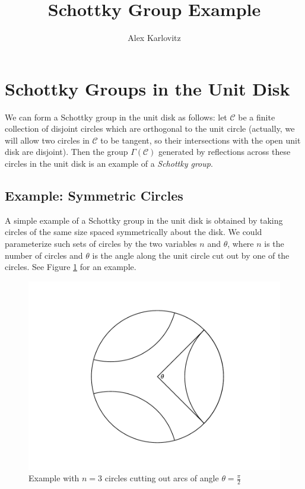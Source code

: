 \documentclass[]{article}
\title{Schottky Group Example}
\author{Alex Karlovitz}
\date{}
\begin{document}
	
	\maketitle
	
\section*{Schottky Groups in the Unit Disk}

We can form a Schottky group in the unit disk as follows:
let $\mathcal{C}$ be a finite collection of disjoint circles which are orthogonal to the unit circle (actually, we will allow two circles in $\mathcal{C}$ to be tangent, so their intersections with the open unit disk are disjoint).
Then the group $\Gamma(\mathcal{C})$ generated by reflections across these circles in the unit disk is an example of a \textit{Schottky group}.

\subsection*{Example: Symmetric Circles}

A simple example of a Schottky group in the unit disk is obtained by taking circles of the same size spaced symmetrically about the disk.
We could parameterize such sets of circles by the two variables $n$ and $\theta$, where $n$ is the number of circles and $\theta$ is the angle along the unit circle cut out by one of the circles.
See Figure \ref{pi_over_2} for an example.

\begin{figure}[h]
	\centering
	\includegraphics[trim=110 40 100 50, clip, width=0.6\linewidth]{pi_over_2.pdf}
	\caption{Example with $n = 3$ circles cutting out arcs of angle $\theta = \frac{\pi}{2}$}
	\label{pi_over_2}
\end{figure}
\end{document}
